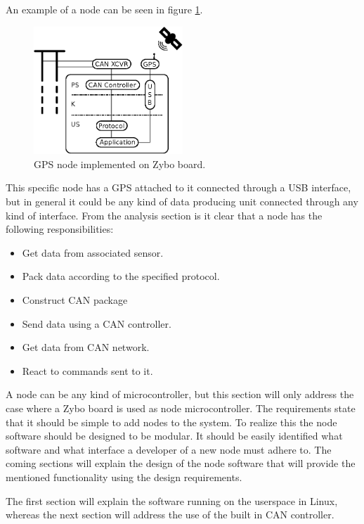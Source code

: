 An example of a node can be seen in figure \ref{fig:gps_node}.

\begin{figure}[!h]
\centering
\includegraphics[width=0.5\textwidth]{graphics/analysis_gps.eps}
\caption{GPS node implemented on Zybo board.}
\label{fig:gps_node}
\end{figure}

This specific node has a GPS attached to it connected through a USB interface, but in general it could be any kind of data producing unit connected through any kind of interface.
From the analysis section is it clear that a node has the following responsibilities:

\begin{itemize}
\item Get data from associated sensor.
\item Pack data according to the specified protocol.
\item Construct CAN package
\item Send data using a CAN controller.
\item Get data from CAN network.
\item React to commands sent to it.
\end{itemize}

A node can be any kind of microcontroller, but this section will only address the case where a Zybo board is used as node microcontroller. 
The requirements state that it should be simple to add nodes to the system. 
To realize this the node software should be designed to be modular.
It should be easily identified what software and what interface a developer of a new node must adhere to.
The coming sections will explain the design of the node software that will provide the mentioned functionality using the design requirements.

The first section will explain the software running on the userspace in Linux, whereas the next section will address the use of the built in CAN controller.	

